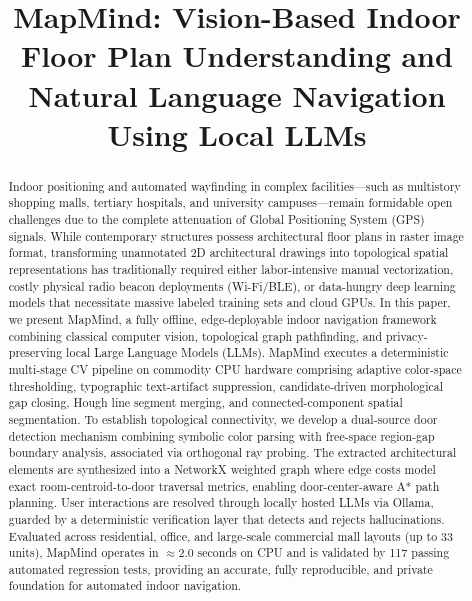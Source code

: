 \documentclass[conference]{IEEEtran}
\begin{document}
\title{MapMind: Vision-Based Indoor Floor Plan Understanding and Natural Language Navigation Using Local LLMs}

\author{
}

\maketitle

\begin{abstract}
Indoor positioning and automated wayfinding in complex facilities—such as multistory shopping malls, tertiary hospitals, and university campuses—remain formidable open challenges due to the complete attenuation of Global Positioning System (GPS) signals. While contemporary structures possess architectural floor plans in raster image format, transforming unannotated 2D architectural drawings into topological spatial representations has traditionally required either labor-intensive manual vectorization, costly physical radio beacon deployments (Wi-Fi/BLE), or data-hungry deep learning models that necessitate massive labeled training sets and cloud GPUs. In this paper, we present MapMind, a fully offline, edge-deployable indoor navigation framework combining classical computer vision, topological graph pathfinding, and privacy-preserving local Large Language Models (LLMs). MapMind executes a deterministic multi-stage CV pipeline on commodity CPU hardware comprising adaptive color-space thresholding, typographic text-artifact suppression, candidate-driven morphological gap closing, Hough line segment merging, and connected-component spatial segmentation. To establish topological connectivity, we develop a dual-source door detection mechanism combining symbolic color parsing with free-space region-gap boundary analysis, associated via orthogonal ray probing. The extracted architectural elements are synthesized into a NetworkX weighted graph where edge costs model exact room-centroid-to-door traversal metrics, enabling door-center-aware A* path planning. User interactions are resolved through locally hosted LLMs via Ollama, guarded by a deterministic verification layer that detects and rejects hallucinations. Evaluated across residential, office, and large-scale commercial mall layouts (up to 33 units), MapMind operates in $\approx$2.0 seconds on CPU and is validated by 117 passing automated regression tests, providing an accurate, fully reproducible, and private foundation for automated indoor navigation.
\end{abstract}
\end{document}
